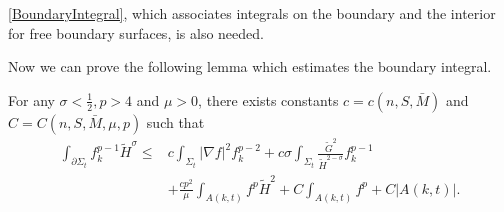 \autoref{BoundaryIntegral}, which associates integrals on the boundary and the interior for free boundary surfaces, is also needed.

Now we can prove the following lemma which estimates the boundary integral.

\begin{lemma} \label{BoundaryFH}
    For any $\sigma <\frac{1}{2}, p>4$ and $\mu >0$, there exists constants $c=c(n,S,\bar{M})$ and $C=C(n,S,\bar{M},\mu ,p)$ such that
    \begin{equation*}
    \begin{split}
        \int_{\partial \Sigma_t} f_{k}^{p-1}\tilde{H}^{\sigma } 
    \leq & c \int_{\Sigma_t} \left| \nabla f \right| ^2 f_{k}^{p-2} +c \sigma \int_{\Sigma_t} \frac{\tilde{G}^{2} }{\tilde{H}^{2-\sigma }  }f_{k}^{p-1} \\
    &+ \frac{cp^2}{\mu }\int_{A(k,t)}^{}f^p \tilde{H}^{2} + C \int_{A(k,t)}^{}f^p + C \left| A(k,t) \right| .
    \end{split}
    \end{equation*} 
\end{lemma}

